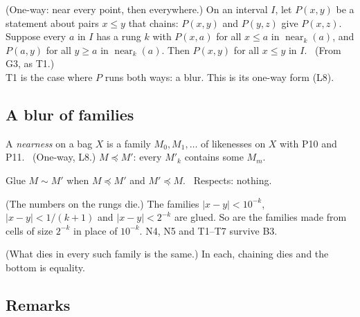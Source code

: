 \begin{lines}
\item[\lab{T8}] (One-way: near every point, then everywhere.) On an interval $I$, let $P(x, y)$ be a statement about pairs $x \le y$ that chains: $P(x, y)$ and $P(y, z)$ give $P(x, z)$. Suppose every $a$ in $I$ has a rung $k$ with $P(x, a)$ for all $x \le a$ in $\operatorname{near}_k(a)$, and $P(a, y)$ for all $y \ge a$ in $\operatorname{near}_k(a)$. Then $P(x, y)$ for all $x \le y$ in $I$. \ (From G3, as T1.) \\
T1 is the case where $P$ runs both ways: a blur. This is its one-way form (L8).
\end{lines}

\subsection*{A blur of families}

\begin{lines}
\item[\lab{D4}] A \emph{nearness} on a bag $X$ is a family $M_0, M_1, \dots$ of likenesses on $X$ with P10 and P11. \ (One-way, L8.) $M \preceq M'$: every $M'_k$ contains some $M_m$.
\item[\lab{B3}] Glue $M \sim M'$ when $M \preceq M'$ and $M' \preceq M$. \ Respects: nothing.
\item[\lab{P15}] (The numbers on the rungs die.) The families $|x - y| < 10^{-k}$, \ $|x - y| < 1/(k+1)$ and $|x - y| < 2^{-k}$ are glued. So are the families made from cells of size $2^{-k}$ in place of $10^{-k}$. N4, N5 and T1--T7 survive B3.
\item[\lab{P16}] (What dies in every such family is the same.) In each, chaining dies and the bottom is equality.
\end{lines}

\subsection*{Remarks}

